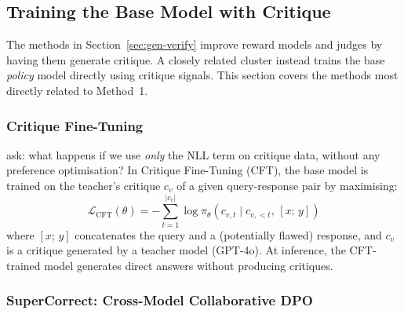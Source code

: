 \subsection{Training the Base Model with Critique}
\label{sec:base-critique}
The methods in Section~\ref{sec:gen-verify} improve reward models and judges by having them generate critique. A closely related cluster instead trains the base \emph{policy} model directly using critique signals. This section covers the methods most directly related to Method~1.
\subsubsection{Critique Fine-Tuning}

\autocite{wang2025critiquefinetuninglearningcritique} ask: what happens if we use \emph{only} the NLL term on critique data, without any preference optimisation? In Critique Fine-Tuning (CFT), the base model is trained on the teacher's critique $c_v$ of a given query-response pair by maximising:
\begin{equation}
    \mathcal{L}_{\text{CFT}}(\theta) = -\sum_{t=1}^{|c_v|} \log \pi_\theta(c_{v,t} \mid c_{v,<t},\, [x;\, y])
    \label{eq:cft}
\end{equation}
where $[x;\, y]$ concatenates the query and a (potentially flawed) response, and $c_v$ is a critique generated by a teacher model (GPT-4o). At inference, the CFT-trained model generates direct answers without producing critiques.

\subsubsection{SuperCorrect: Cross-Model Collaborative DPO}

